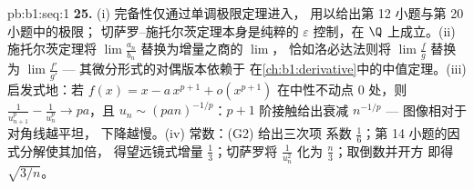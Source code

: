 \begin{solution}{pb:b1:seq:1}
\textbf{25.} (i) 完备性仅通过单调极限定理进入，
用以给出第 12 小题与第 20 小题中的极限；
切萨罗--施托尔茨定理本身是纯粹的
$\varepsilon$ 控制，在 $\Q$ 上成立。(ii) 施托尔茨定理将
$\lim \frac{a_n}{b_n}$ 替换为增量之商的 $\lim$，
恰如洛必达法则将 $\lim\frac fg$ 替换为
$\lim\frac{f'}{g'}$ --- 其微分形式的对偶版本依赖于
在\cref{ch:b1:derivative}中的中值定理。(iii) 启发式地：若
$f(x) = x - a\,x^{p+1} + o(x^{p+1})$ 在中性不动点
$0$ 处，则 $\frac{1}{u_{n+1}^p} - \frac{1}{u_n^p} \to pa$，且
$u_n \sim (pan)^{-1/p}$：$p + 1$ 阶接触给出衰减
$n^{-1/p}$ --- 图像相对于对角线越平坦，
下降越慢。(iv) 常数：(G2) 给出三次项
系数 $\frac16$；第 14 小题的因式分解使其加倍，
得望远镜式增量 $\frac13$；切萨罗将
$\frac{1}{u_n^2}$ 化为 $\frac n3$；取倒数并开方
即得 $\sqrt{3/n}$。
\end{solution}
